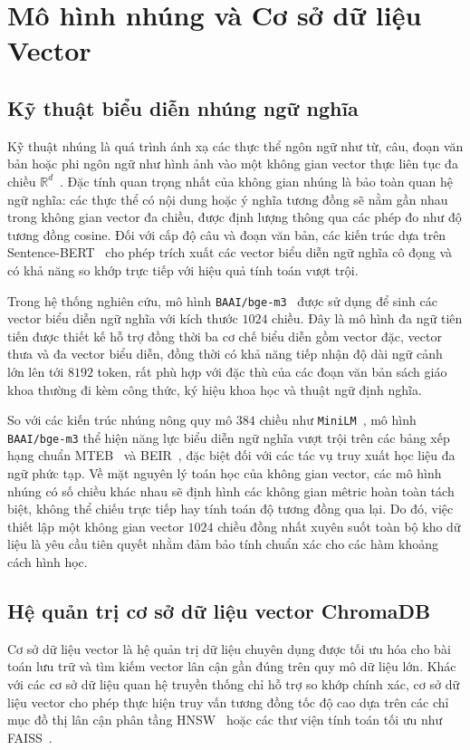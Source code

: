 \section{Mô hình nhúng và Cơ sở dữ liệu Vector}
\subsection{Kỹ thuật biểu diễn nhúng ngữ nghĩa}
Kỹ thuật nhúng là quá trình ánh xạ các thực thể ngôn ngữ như từ, câu, đoạn văn bản hoặc phi ngôn ngữ như hình ảnh vào một không gian vector thực liên tục đa chiều $\mathbb{R}^d$~\cite{mikolov2013word2vec}. Đặc tính quan trọng nhất của không gian nhúng là bảo toàn quan hệ ngữ nghĩa: các thực thể có nội dung hoặc ý nghĩa tương đồng sẽ nằm gần nhau trong không gian vector đa chiều, được định lượng thông qua các phép đo như độ tương đồng cosine. Đối với cấp độ câu và đoạn văn bản, các kiến trúc dựa trên Sentence-BERT~\cite{reimers2019sbert} cho phép trích xuất các vector biểu diễn ngữ nghĩa cô đọng và có khả năng so khớp trực tiếp với hiệu quả tính toán vượt trội.

Trong hệ thống nghiên cứu, mô hình \texttt{BAAI/bge-m3}~\cite{chen2024bgem3} được sử dụng để sinh các vector biểu diễn ngữ nghĩa với kích thước $1024$ chiều. Đây là mô hình đa ngữ tiên tiến được thiết kế hỗ trợ đồng thời ba cơ chế biểu diễn gồm vector đặc, vector thưa và đa vector biểu diễn, đồng thời có khả năng tiếp nhận độ dài ngữ cảnh lớn lên tới $8192$ token, rất phù hợp với đặc thù của các đoạn văn bản sách giáo khoa thường đi kèm công thức, ký hiệu khoa học và thuật ngữ định nghĩa.

So với các kiến trúc nhúng nông quy mô $384$ chiều như \texttt{MiniLM}~\cite{wang2020minilm}, mô hình \texttt{BAAI/bge-m3} thể hiện năng lực biểu diễn ngữ nghĩa vượt trội trên các bảng xếp hạng chuẩn MTEB~\cite{muennighoff2022mteb} và BEIR~\cite{thakur2021beir}, đặc biệt đối với các tác vụ truy xuất học liệu đa ngữ phức tạp. Về mặt nguyên lý toán học của không gian vector, các mô hình nhúng có số chiều khác nhau sẽ định hình các không gian mêtric hoàn toàn tách biệt, không thể chiếu trực tiếp hay tính toán độ tương đồng qua lại. Do đó, việc thiết lập một không gian vector $1024$ chiều đồng nhất xuyên suốt toàn bộ kho dữ liệu là yêu cầu tiên quyết nhằm đảm bảo tính chuẩn xác cho các hàm khoảng cách hình học.

\subsection{Hệ quản trị cơ sở dữ liệu vector ChromaDB}
Cơ sở dữ liệu vector là hệ quản trị dữ liệu chuyên dụng được tối ưu hóa cho bài toán lưu trữ và tìm kiếm vector lân cận gần đúng trên quy mô dữ liệu lớn. Khác với các cơ sở dữ liệu quan hệ truyền thống chỉ hỗ trợ so khớp chính xác, cơ sở dữ liệu vector cho phép thực hiện truy vấn tương đồng tốc độ cao dựa trên các chỉ mục đồ thị lân cận phân tầng HNSW~\cite{malkov2018hnsw} hoặc các thư viện tính toán tối ưu như FAISS~\cite{johnson2019faiss}.

